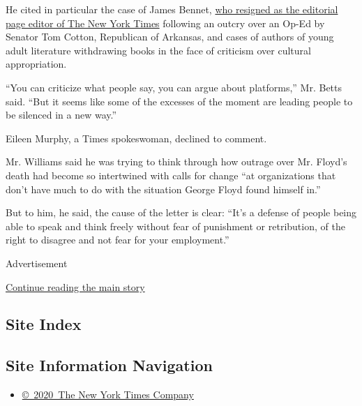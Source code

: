 He cited in particular the case of James Bennet,
\href{https://www.nytimes.com/2020/06/07/business/media/james-bennet-resigns-nytimes-op-ed.html}{who
resigned as the editorial page editor of The New York Times} following
an outcry over an Op-Ed by Senator Tom Cotton, Republican of Arkansas,
and cases of authors of young adult literature withdrawing books in the
face of criticism over cultural appropriation.

``You can criticize what people say, you can argue about platforms,''
Mr. Betts said. ``But it seems like some of the excesses of the moment
are leading people to be silenced in a new way.''

Eileen Murphy, a Times spokeswoman, declined to comment.

Mr. Williams said he was trying to think through how outrage over Mr.
Floyd's death had become so intertwined with calls for change ``at
organizations that don't have much to do with the situation George Floyd
found himself in.''

But to him, he said, the cause of the letter is clear: ``It's a defense
of people being able to speak and think freely without fear of
punishment or retribution, of the right to disagree and not fear for
your employment.''

Advertisement

\protect\hyperlink{after-bottom}{Continue reading the main story}

\hypertarget{site-index}{%
\subsection{Site Index}\label{site-index}}

\hypertarget{site-information-navigation}{%
\subsection{Site Information
Navigation}\label{site-information-navigation}}

\begin{itemize}
\tightlist
\item
  \href{https://help.nytimes.com/hc/en-us/articles/115014792127-Copyright-notice}{©~2020~The
  New York Times Company}
\end{itemize}

